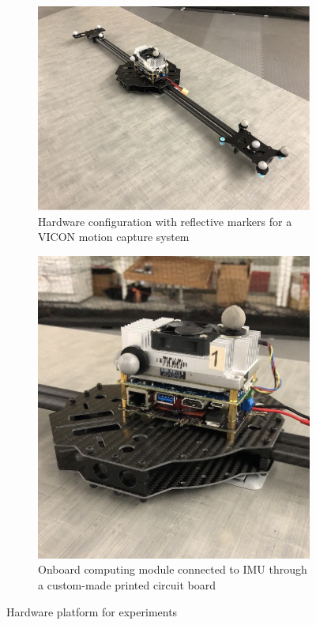 \begin{figure}
	\begin{subfigure}{0.45\textwidth}
		\centering
		\includegraphics[width=\textwidth]{figures/observability/exp1.jpeg}
		\caption{Hardware configuration with reflective markers for a VICON motion capture system}
	\end{subfigure}
	\hspace{0.1\textwidth}
	\begin{subfigure}{0.45\textwidth}
		\centering
		\includegraphics[width=\textwidth]{figures/observability/exp2.jpeg}
		\caption{Onboard computing module connected to IMU through a custom-made printed circuit board}
	\end{subfigure}
	\caption{Hardware platform for experiments} \label{fig:observability-exp-hardware}
\end{figure}

